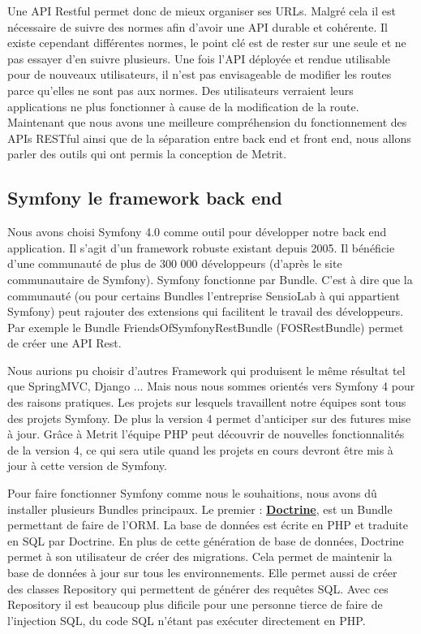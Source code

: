 \documentclass[12pt, twoside, openright]{report}
\begin{document}
Une API Restful permet donc de mieux organiser ses URLs. Malgré cela il est nécessaire de suivre des normes afin d'avoir une API durable et cohérente. Il existe cependant différentes normes, le point clé est de rester sur une seule et ne pas essayer d'en suivre plusieurs. Une fois l'API déployée et rendue utilisable pour de nouveaux utilisateurs, il n'est pas envisageable de modifier les routes parce qu’elles ne sont pas aux normes. Des utilisateurs verraient leurs applications ne plus fonctionner à cause de la modification de la route. Maintenant que nous avons une meilleure compréhension du fonctionnement des APIs RESTful ainsi que de la séparation entre back end et front end, nous allons parler des outils qui ont permis la conception de Metrit.

\subsection{Symfony le framework back end}

Nous avons choisi Symfony 4.0 comme outil pour développer notre back end application. Il s'agit d'un framework robuste existant depuis 2005. Il bénéficie d'une communauté de plus de 300 000 développeurs (d'après le site communautaire de Symfony). Symfony fonctionne par Bundle. C'est à dire que la communauté (ou pour certains Bundles l'entreprise SensioLab à qui appartient Symfony) peut rajouter des extensions qui facilitent le travail des développeurs. Par exemple le Bundle FriendsOfSymfonyRestBundle (FOSRestBundle) permet de créer une API Rest. 

Nous aurions pu choisir d'autres Framework qui produisent le même résultat tel que SpringMVC, Django ... Mais nous nous sommes orientés vers Symfony 4 pour des raisons pratiques. Les projets sur lesquels travaillent notre équipes sont tous des projets Symfony. De plus la version 4 permet d'anticiper sur des futures mise à jour. Grâce à Metrit l'équipe PHP peut découvrir de nouvelles fonctionnalités de la version 4, ce qui sera utile quand les projets en cours devront être mis à jour à cette version de Symfony. 

Pour faire fonctionner Symfony comme nous le souhaitions, nous avons dû installer plusieurs Bundles principaux. Le premier : \href{https://symfony.com/doc/current/doctrine.html}{\textbf{Doctrine}}, est un Bundle permettant de faire de l'ORM. La base de données est écrite en PHP et traduite en SQL par Doctrine. En plus de cette génération de base de données, Doctrine permet à son utilisateur de créer des migrations. Cela permet de maintenir la base de données à jour sur tous les environnements. Elle permet aussi de créer des classes Repository qui permettent de générer des requêtes SQL. Avec ces Repository il est beaucoup plus dificile pour une personne tierce de faire de l'injection SQL, du code SQL n'étant pas exécuter directement en PHP. 
\end{document}
